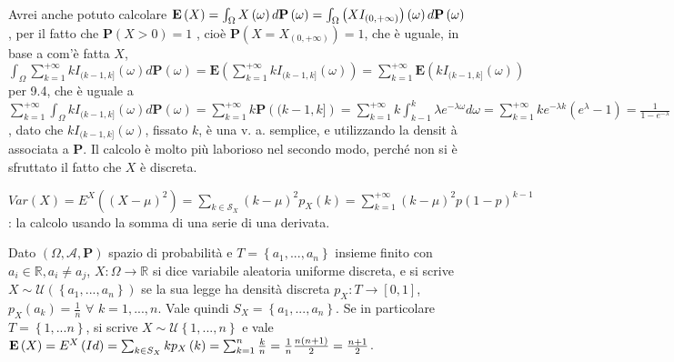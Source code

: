 \documentclass{article}
\begin{document}
\begin{description}
\item Avrei anche potuto calcolare $\mathbf{E}\left( X\right) =\int_{\Omega
}X\left( \omega \right) d\mathbf{P}\left( \omega \right) =\int_{\Omega
}\left( XI_{\left( 0,+\infty \right) }\right) \left( \omega \right) d\mathbf{%
P}\left( \omega \right) $, per il fatto che $\mathbf{P}\left( X>0\right) =1$%
, cio\`{e} $\mathbf{P}\left( X=X_{\left( 0,+\infty \right) }\right) =1$, che 
\`{e} uguale, in base a com'\`{e} fatta $X$, $\int_{\Omega
}\sum_{k=1}^{+\infty }kI_{(k-1,k]}\left( \omega \right) d\mathbf{P}\left(
\omega \right) =\mathbf{E}\left( \sum_{k=1}^{+\infty }kI_{(k-1,k]}\left(
\omega \right) \right) =\sum_{k=1}^{+\infty }\mathbf{E}\left(
kI_{(k-1,k]}\left( \omega \right) \right) $ per 9.4, che \`{e} uguale a $%
\sum_{k=1}^{+\infty }\int_{\Omega }kI_{(k-1,k]}\left( \omega \right) d%
\mathbf{P}\left( \omega \right) =\sum_{k=1}^{+\infty }k\mathbf{P}\left(
(k-1,k]\right) =\sum_{k=1}^{+\infty }k\int_{k-1}^{k}\lambda e^{-\lambda
\omega }d\omega =\sum_{k=1}^{+\infty }ke^{-\lambda k}\left( e^{\lambda
}-1\right) =\frac{1}{1-e^{-\lambda }}$, dato che $kI_{(k-1,k]}\left( \omega
\right) $, fissato $k$, \`{e} una v. a. semplice, e utilizzando la densit%
\`{a} associata a $\mathbf{P}$. Il calcolo \`{e} molto pi\`{u} laborioso nel
secondo modo, perch\'{e} non si \`{e} sfruttato il fatto che $X$ \`{e}
discreta.

\item $Var\left( X\right) =E^{X}\left( \left( X-\mu \right) ^{2}\right)
=\sum_{k\in \mathcal{S}_{X}}\left( k-\mu \right) ^{2}p_{X}\left( k\right)
=\sum_{k=1}^{+\infty }\left( k-\mu \right) ^{2}p\left( 1-p\right) ^{k-1}$:
la calcolo usando la somma di una serie di una derivata.

\item[E2] Dato $\left( \Omega ,\mathcal{A},\mathbf{P}\right) $ spazio di
probabilit\`{a} e $T=\left\{ a_{1},...,a_{n}\right\} $ insieme finito con $%
a_{i}\in 
\mathbb{R}
,a_{i}\neq a_{j}$, $X:\Omega \rightarrow 
\mathbb{R}
$ si dice variabile aleatoria uniforme discreta, e si scrive \ $X\sim 
\mathcal{U}\left( \left\{ a_{1},...,a_{n}\right\} \right) $ se la sua legge
ha densit\`{a} discreta $p_{X}:T\rightarrow \left[ 0,1\right] $, $%
p_{X}\left( a_{k}\right) =\frac{1}{n}$ $\forall $ $k=1,...,n$. Vale quindi $%
S_{X}=\left\{ a_{1},...,a_{n}\right\} $. Se in particolare $T=\left\{
1,...n\right\} $, si scrive $X\sim \mathcal{U}\left\{ 1,...,n\right\} $ e
vale $\mathbf{E}\left( X\right) =E^{X}\left( Id\right) =\sum_{k\in
S_{X}}kp_{X}\left( k\right) =\sum_{k=1}^{n}\frac{k}{n}=\frac{1}{n}\frac{%
n\left( n+1\right) }{2}=\frac{n+1}{2}$.


\end{description}
\end{document}
